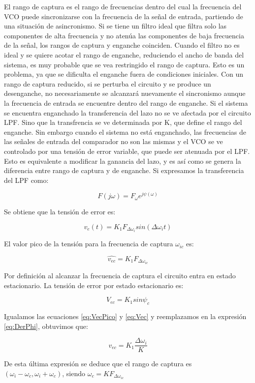 El rango de captura es el rango de frecuencias dentro del cual la frecuencia del VCO puede sincronizarse con la
frecuencia de la señal de entrada, partiendo de una situación de asincronismo. Si se tiene un filtro ideal que filtra solo las componentes de alta frecuencia y no atenúa las componentes de baja frecuencia de la señal, los rangos de captura y enganche coinciden. Cuando el filtro no es ideal y se quiere acotar el rango de enganche, reduciendo el ancho de banda del sistema, es muy probable que se vea restringido el rango de captura. Esto es un problema, ya que se dificulta el enganche fuera de condiciones iniciales. Con un rango de captura reducido, si se perturba el circuito y se produce un desenganche, no necesariamente se alcanzará nuevamente el sincronismo aunque la frecuencia de entrada se encuentre dentro del rango de enganche.
Si el sistema se encuentra enganchado la transferencia del lazo no se ve afectada por el circuito LPF. Sino que la transfrencia se ve determinada por K, que define el rango del enganche. Sin embargo cuando el sistema no está enganchado, las frecuencias de las señales de entrada del comparador no son las mismas y el VCO se ve controlado por una tensión de error variable, que puede ser atenuada por el LPF. Esto es equivalente a modificar la ganancia del lazo, y es así como se genera la diferencia entre rango de captura y de enganche. Si expresamos la transferencia del LPF como:

\begin{equation}
F(j\omega) = F_{\omega}e^{j\psi(\omega)}
\end{equation}

Se obtiene que la tensión de error es:

\begin{equation}
v_e(t) = K_1F_{\Delta\omega_i}sin(\Delta\omega_i t)
\end{equation}

El valor pico de la tensión para la frecuencia de captura $\omega_{ic}$ es:

\begin{equation}
	\hat{v_{ec}} = K_1F_{\Delta\omega_{ic}}
	\label{eq:VecPico}
\end{equation}

Por definición al alcanzar la frecuencia de captura el circuito entra en estado estacionario. La tensión de error por estado estacionario es:

\begin{equation}
	V_{ec} = K_1 sin\psi_c
	\label{eq:Vec}
\end{equation}

Igualamos las ecuaciones \ref{eq:VecPico} y \ref{eq:Vec} y reemplazamos en la expresión \ref{eq:DerPhi}, obtuvimos que:

\begin{equation}
	v_{ec} = K_1 \frac{\Delta\omega_i}{K}
	\label{eq:finalVec}
\end{equation}

De esta última expresión se deduce que el rango de captura es $(\omega_i-\omega_c , \omega_i+\omega_c)$, siendo $\omega_c = KF_{\Delta\omega_{ic}}$